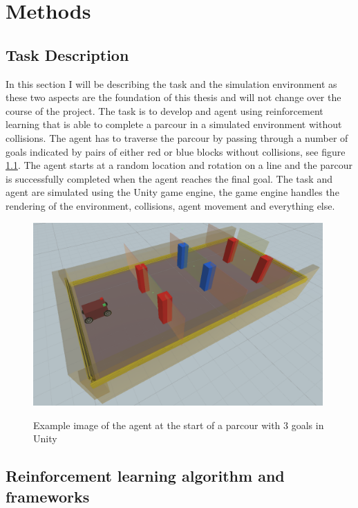 \chapter{Methods}
\label{cha:Methods}



\section{Task Description}

In this section I will be describing the task and the simulation environment as these two aspects are the foundation of this thesis and will not change over the course of the project.
The task is to develop and agent using reinforcement learning that is able to complete a parcour in a simulated environment without collisions. The agent has to traverse the parcour by passing through a number of goals indicated by pairs of either red or blue blocks without collisions, see figure \ref*{task}. The agent starts at a random location and rotation on a line and the parcour is successfully completed when the agent reaches the final goal.
The task and agent are simulated using the Unity game engine, the game engine handles the rendering of the environment, collisions, agent movement and everything else.


\begin{figure}[h!]
     \includegraphics[height=7cm]{Bilder/parcour.png}\\[2.5ex]
     \caption{Example image of the agent at the start of a parcour with 3 goals in Unity}
     \label{task}
\end{figure}





\section{Reinforcement learning algorithm and frameworks}

